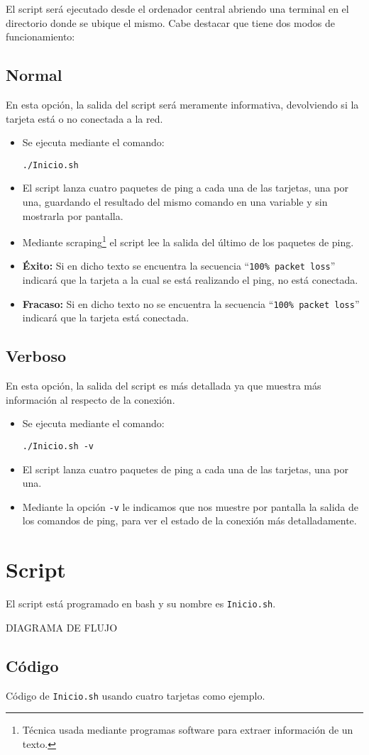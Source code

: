 \documentclass[12pt,letterpaper]{article}
\begin{document}
El script será ejecutado desde el ordenador central abriendo una terminal en el directorio donde se ubique el mismo. Cabe destacar que tiene dos modos de funcionamiento:

\subsection{Normal}
En esta opción, la salida del script será meramente informativa, devolviendo si la tarjeta está o no conectada a la red.
\begin{itemize}
	\item Se ejecuta mediante el comando:
	\begin{center}
		\texttt{./Inicio.sh}
	\end{center}
	\item El script lanza cuatro paquetes de ping a cada una de las tarjetas, una por una, guardando el resultado del mismo comando en una variable y sin mostrarla por pantalla.
	\item Mediante scraping\footnote{Técnica usada mediante programas software para extraer información de un texto.} el script lee la salida del último de los paquetes de ping.
	\item \textbf{Éxito:} Si en dicho texto se encuentra la secuencia ``\texttt{100\% packet loss}'' indicará que la tarjeta a la cual se está realizando el ping, no está conectada.
	\item \textbf{Fracaso:} Si en dicho texto no se encuentra la secuencia ``\texttt{100\% packet loss}'' indicará que la tarjeta está conectada.
\end{itemize}

\subsection{Verboso}
En esta opción, la salida del script es más detallada ya que muestra más información al respecto de la conexión.

\begin{itemize}
	\item Se ejecuta mediante el comando:
	\begin{center}
		\texttt{./Inicio.sh -v}
	\end{center}
	\item El script lanza cuatro paquetes de ping a cada una de las tarjetas, una por una.
	\item Mediante la opción \texttt{-v} le indicamos que nos muestre por pantalla la salida de los comandos de ping, para ver el estado de la conexión más detalladamente.
\end{itemize}

\section{Script}
El script está programado en bash y su nombre es \texttt{Inicio.sh}.

\vspace{2cm}
DIAGRAMA DE FLUJO

\newpage
\subsection{Código}

\begin{center}
	Código de \texttt{Inicio.sh} usando cuatro tarjetas como ejemplo.
\end{center}
\end{document}
